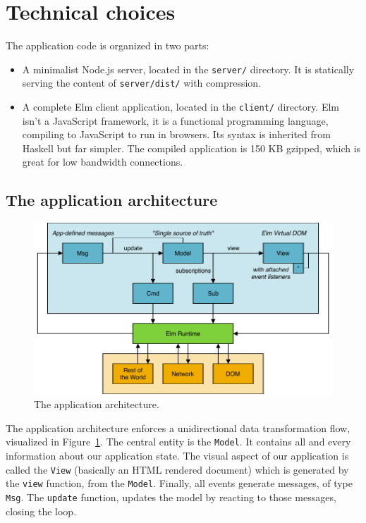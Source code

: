 \section{Technical choices}

The application code is organized in two parts:

\begin{itemize}
\item A minimalist Node.js server, located in the \verb|server/| directory.
	It is statically serving the content of \verb|server/dist/|
    with compression.
\item A complete Elm client application, located in the \verb|client/| directory.
    Elm~\cite{czaplicki2013asynchronous,czaplicki2017elm}
    isn't a JavaScript framework, it is a functional programming language,
	compiling to JavaScript to run in browsers.
	Its syntax is inherited from Haskell but far simpler.
	The compiled application is 150 KB gzipped,
    which is great for low bandwidth connections.
\end{itemize}


\subsection{The application architecture}

\begin{figure}[ht]
\includegraphics[width=\columnwidth]{img/tea-draw-io.pdf}
\caption{The application architecture.}%
\label{fig:tea}
\end{figure}

The application architecture enforces a unidirectional data transformation flow,
visualized in Figure~\ref{fig:tea}.
The central entity is the \verb|Model|.
It contains all and every information about our application state.
The visual aspect of our application is called the \verb|View|
(basically an HTML rendered document) which is generated by the \verb|view| function,
from the \verb|Model|. Finally, all events generate messages, of type \verb|Msg|.
The \verb|update| function, updates the model by reacting to those messages, closing the loop.

